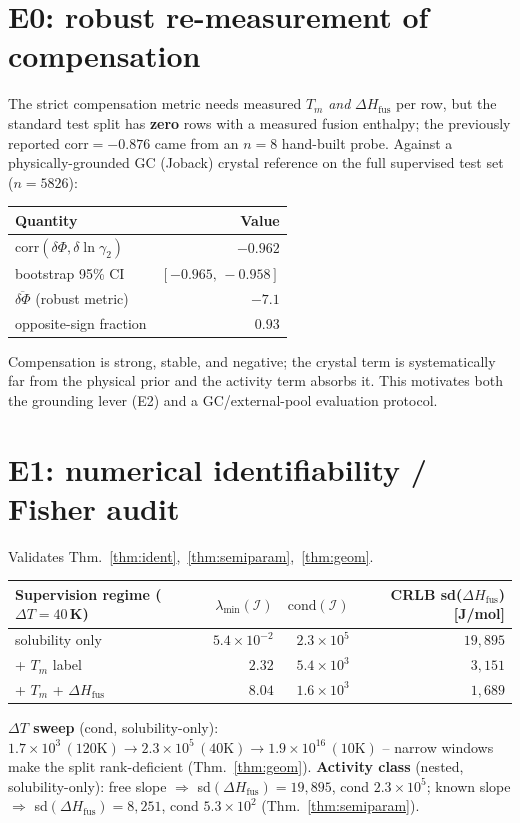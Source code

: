 \documentclass[11pt]{article}
\newcommand{\Phicry}{\Phi}
\newcommand{\dHfus}{\Delta H_{\mathrm{fus}}}
\newcommand{\Tm}{T_m}
\newcommand{\lng}{\ln\gamma_2}
\begin{document}
\section{E0: robust re-measurement of compensation}
\label{sec:e0}
The strict compensation metric needs measured $\Tm$ \emph{and} $\dHfus$ per row,
but the standard test split has \textbf{zero} rows with a measured fusion
enthalpy; the previously reported $\mathrm{corr}=-0.876$ came from an $n{=}8$
hand-built probe. Against a physically-grounded GC (Joback) crystal reference on
the full supervised test set ($n=5826$):
\begin{center}
\begin{tabular}{lr}
\toprule
Quantity & Value \\
\midrule
$\mathrm{corr}(\delta\Phicry,\delta\lng)$ & $-0.962$ \\
\quad bootstrap 95\% CI & $[-0.965,\,-0.958]$ \\
$\overline{\delta\Phicry}$ (robust metric) & $-7.1$ \\
opposite-sign fraction & $0.93$ \\
\bottomrule
\end{tabular}
\end{center}
Compensation is strong, stable, and negative; the crystal term is systematically
far from the physical prior and the activity term absorbs it. This motivates both
the grounding lever (E2) and a GC/external-pool evaluation protocol.

\section{E1: numerical identifiability / Fisher audit}
\label{sec:e1}
Validates Thm.~\ref{thm:ident},~\ref{thm:semiparam},~\ref{thm:geom}.
\begin{center}
\begin{tabular}{lrrr}
\toprule
Supervision regime ($\Delta T=40$\,K) & $\lambda_{\min}(\mathcal I)$ & $\mathrm{cond}(\mathcal I)$ & CRLB sd($\dHfus$) [J/mol] \\
\midrule
solubility only      & $5.4\times10^{-2}$ & $2.3\times10^{5}$ & $19{,}895$ \\
\;+ $\Tm$ label       & $2.32$ & $5.4\times10^{3}$ & $3{,}151$ \\
\;+ $\Tm$ + $\dHfus$  & $8.04$ & $1.6\times10^{3}$ & $1{,}689$ \\
\bottomrule
\end{tabular}
\end{center}
\noindent\textbf{$\Delta T$ sweep} (cond, solubility-only):
$1.7\times10^{3}\,(120\text{K})\to2.3\times10^{5}\,(40\text{K})\to1.9\times10^{16}\,(10\text{K})$
-- narrow windows make the split rank-deficient (Thm.~\ref{thm:geom}).
\noindent\textbf{Activity class} (nested, solubility-only): free slope
$\Rightarrow$ sd$(\dHfus)=19{,}895$, cond $2.3\times10^5$; known slope
$\Rightarrow$ sd$(\dHfus)=8{,}251$, cond $5.3\times10^2$ (Thm.~\ref{thm:semiparam}).
\end{document}

